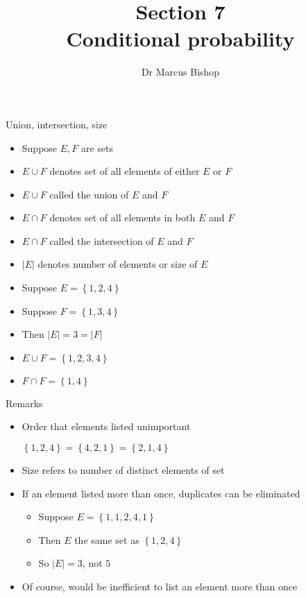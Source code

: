 \documentclass[handout]{beamer}
\title[\S7]{Section 7\\Conditional probability}
\author{Dr Marcus Bishop}
\theoremstyle{definition}
\begin{document}
\begin{frame}\titlepage\end{frame}
\LogoOff

\begin{frame}{Union, intersection, size}
\begin{itemize}
\item Suppose $E,F$ are sets
\item $E\cup F$ denotes set of all elements of either
$E$ or $F$
\item $E\cup F$ called the \alert{union} of $E$ and $F$
\item $E\cap F$ denotes set of all elements in both
$E$ and $F$
\item $E\cap F$ called the \alert{intersection} of $E$ and $F$
\item $\left|E\right|$ denotes number of elements
or \alert{size} of $E$
\end{itemize}
\begin{example}
\begin{itemize}
\item Suppose $E=\left\{1,2,4\right\}$
\item Suppose $F=\left\{1,3,4\right\}$
\item Then $\left|E\right|=3=\left|F\right|$
\item $E\cup F=\left\{1,2,3,4\right\}$
\item $F\cap F=\left\{1,4\right\}$
\end{itemize}
\end{example}
\end{frame}

\begin{frame}{Remarks}
\begin{itemize}
\item Order that elements listed unimportant
\begin{example}
$\left\{1,2,4\right\}=\left\{4,2,1\right\}=\left\{2,1,4\right\}$
\end{example}
\item Size refers to number of \alert{distinct} elements
of set
\item If an element listed more than once, duplicates can be eliminated
\begin{example}
\begin{itemize}
\item Suppose $E=\left\{1,1,2,4,1\right\}$
\item Then $E$ the same set as $\left\{1,2,4\right\}$
\item So $\left|E\right|=3$, not $5$
\end{itemize}
\end{example}
\item Of course, would be inefficient to list
an element more than once
\end{itemize}
\end{frame}
\end{document}
